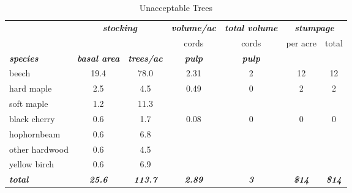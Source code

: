 \documentclass[landscape]{article}
\begin{document}
\begin{table}[H]

\caption{\label{tab:unnamed-chunk-57}Unacceptable Trees}
\fontsize{10}{12}\selectfont
\begin{tabular}[t]{lcccccc}
\toprule
\multicolumn{1}{c}{\em{\textbf{ }}} & \multicolumn{2}{c}{\em{\textbf{stocking}}} & \multicolumn{1}{c}{\em{\textbf{volume/ac }}} & \multicolumn{1}{c}{\em{\textbf{total volume}}} & \multicolumn{2}{c}{\em{\textbf{stumpage}}} \\
\cmidrule(l{3pt}r{3pt}){2-3} \cmidrule(l{3pt}r{3pt}){4-4} \cmidrule(l{3pt}r{3pt}){5-5} \cmidrule(l{3pt}r{3pt}){6-7}
\multicolumn{3}{c}{ } & \multicolumn{1}{c}{cords} & \multicolumn{1}{c}{cords} & \multicolumn{1}{c}{per acre} & \multicolumn{1}{c}{total} \\
\cmidrule(l{3pt}r{3pt}){4-4} \cmidrule(l{3pt}r{3pt}){5-5} \cmidrule(l{3pt}r{3pt}){6-6} \cmidrule(l{3pt}r{3pt}){7-7}
\rowcolor[HTML]{DCDCDC}  \em{\textbf{species}} & \em{\textbf{basal area}} & \em{\textbf{trees/ac}} & \em{\textbf{pulp}} & \em{\textbf{pulp}} & \em{\textbf{ }} & \em{\textbf{ }}\\
\midrule
\rowcolor{gray!6}  beech & 19.4 & 78.0 & 2.31 & 2 & 12 & 12\\
 
hard maple & 2.5 & 4.5 & 0.49 & 0 & 2 & 2\\
 
\rowcolor{gray!6}  soft maple & 1.2 & 11.3 &  &  &  & \\
 
black cherry & 0.6 & 1.7 & 0.08 & 0 & 0 & 0\\
 
\rowcolor{gray!6}  hophornbeam & 0.6 & 6.8 &  &  &  & \\
 
other hardwood & 0.6 & 4.5 &  &  &  & \\
 
\rowcolor{gray!6}  yellow birch & 0.6 & 6.9 &  &  &  & \\
 
\rowcolor[HTML]{DCDCDC}  \em{\textbf{total}} & \em{\textbf{25.6}} & \em{\textbf{113.7}} & \em{\textbf{2.89}} & \em{\textbf{3}} & \em{\textbf{\$14}} & \em{\textbf{\$14}}\\
\bottomrule
\end{tabular}
\end{table}
\end{document}
